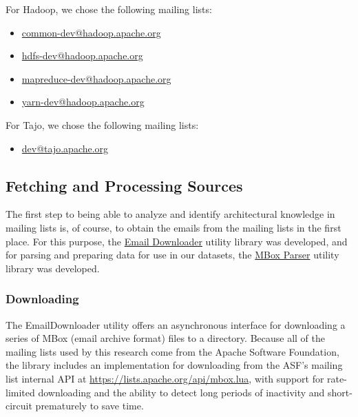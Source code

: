 \documentclass[a4paper, 12pt]{article}
\begin{document}
		For Hadoop, we chose the following mailing lists:
		\begin{itemize}
			\item \href{https://lists.apache.org/list.html?common-dev@hadoop.apache.org}{common-dev@hadoop.apache.org}
			\item \href{https://lists.apache.org/list.html?hdfs-dev@hadoop.apache.org}{hdfs-dev@hadoop.apache.org}
			\item \href{https://lists.apache.org/list.html?mapreduce-dev@hadoop.apache.org}{mapreduce-dev@hadoop.apache.org}
			\item \href{https://lists.apache.org/list.html?yarn-dev@hadoop.apache.org}{yarn-dev@hadoop.apache.org}
		\end{itemize}
	
		For Tajo, we chose the following mailing lists:
		\begin{itemize}
			\item \href{https://lists.apache.org/list.html?dev@tajo.apache.org}{dev@tajo.apache.org}
		\end{itemize}
	
	\subsection{Fetching and Processing Sources}
		The first step to being able to analyze and identify architectural knowledge in mailing lists is, of course, to obtain the emails from the mailing lists in the first place. For this purpose, the \hyperref[sec:email-downloader]{Email Downloader} utility library was developed, and for parsing and preparing data for use in our datasets, the \hyperref[sec:mbox-parser]{MBox Parser} utility library was developed.
		
		\subsubsection{Downloading}
			The EmailDownloader utility offers an asynchronous interface for downloading a series of MBox (email archive format) files to a directory. Because all of the mailing lists used by this research come from the Apache Software Foundation, the library includes an implementation for downloading from the ASF's mailing list internal API at \href{https://lists.apache.org/api/mbox.lua}{https://lists.apache.org/api/mbox.lua}, with support for rate-limited downloading and the ability to detect long periods of inactivity and short-circuit prematurely to save time.
			
\end{document}
